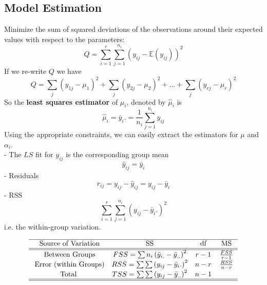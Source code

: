 \documentclass[11pt,a4paper]{article}
\begin{document}
\subsection{Model Estimation}
Minimize the sum of squared deviations of the observations around their expected values with respect to the parameters:
$$
Q=\sum_{i=1}^{r} \sum_{j=1}^{n_{i}}\left(y_{i j}-\mathbb{E}\left(y_{i j}\right)\right)^{2}
$$
If we re-write $Q$ we have
$$
Q=\sum_{j}\left(y_{1 j}-\mu_{1}\right)^{2}+\sum_{j}\left(y_{2 j}-\mu_{2}\right)^{2}+\ldots+\sum_{j}\left(y_{r j}-\mu_{r}\right)^{2}
$$
So the \textbf{least squares estimator} of $\mu_{i}$, denoted by $\hat{\mu}_{i}$ is
$$
\hat{\mu}_{i}=\bar{y}_{i} .=\frac{1}{n_{i}} \sum_{j=1}^{n_{i}} y_{i j}
$$
Using the appropriate constraints, we can easily extract the estimators for $\mu$ and $\alpha_{i}$.\\
- The $L S$ fit for $y_{i j}$ is the corresponding group mean
$$
\hat{y}_{i j}=\bar{y}_{i}
$$
- Residuals
$$
r_{i j}=y_{i j}-\hat{y}_{i j}=y_{i j}-\bar{y}_{i}
$$
- RSS
$$
\sum_{i=1}^{r} \sum_{j=1}^{n_{i}}\left(y_{i j}-\bar{y}_{i} .\right)^{2}
$$
i.e. the within-group variation.

\begin{equation}
    \begin{array}{cccc}
    \hline
    \text { Source of Variation} & \text { SS } &\text { df } & \text { MS } \\
    \hline \hline \text { Between Groups}& F S S=\sum n_{i}\left(\bar{y}_{i.}-\bar{y}_{..}\right)^{2} & r-1 & \frac{F S S}{r-1} \\
    \text { Error (within Groups)}& R S S=\sum \sum\left(y_{i j}-\bar{y}_{i} .\right)^{2} & n-r & \frac{R S S}{n-r} \\
    \text { Total } & T S S=\sum \sum\left(y_{i j}-\bar{y}_{. .}\right)^{2} & n-1\\
    \hline \hline
    \end{array}
    \nonumber
\end{equation}
\end{document}

